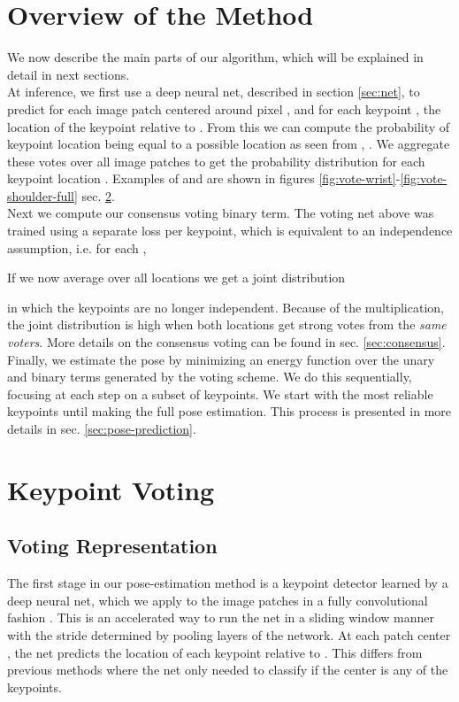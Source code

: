\documentclass{article}
\begin{document}
\section{Overview of the Method}
We now describe the main parts of our algorithm, which will be explained in detail in next sections.\\

At inference, we first use a deep neural net, described in section \ref{sec:net}, to predict for each image patch  centered around pixel , and for each keypoint , the location of the keypoint relative to . From this we can compute the probability of keypoint location   being equal to a possible location  as seen from , . We aggregate these votes over all image patches to get the probability distribution for each keypoint location .  Examples of  and  are shown in figures \ref{fig:vote-wrist}-\ref{fig:vote-shoulder-full} sec. \ref{sec:voting}.\\

Next we compute our consensus voting binary term. The voting net above was trained using a separate loss  per keypoint, which is equivalent to an independence assumption, i.e. for each ,


If we now average over all locations  we get a joint distribution 

in which the keypoints are no longer independent. Because of the multiplication, the joint distribution is high when both locations get strong votes from the \emph{same voters}. More details on the consensus voting can be found in sec. \ref{sec:consensus}.\\

Finally, we estimate the pose by minimizing an energy function over the unary and binary terms generated by the voting scheme. We do this sequentially, focusing at each step on a subset of keypoints. We start with the most reliable keypoints until making the full pose estimation. This process is presented in more details in sec. \ref{sec:pose-prediction}.   



\section{Keypoint Voting}\label{sec:voting}
\subsection{Voting Representation}

The first stage in our pose-estimation method is a keypoint detector learned by a deep neural net, which we apply to the image patches in a fully convolutional fashion \cite{Long15}. This is an accelerated way to run the net in a sliding window manner with the stride determined by pooling layers of the network. At each patch center , the net predicts the location of each keypoint  relative to . This differs from previous methods \cite{Tompson14,Tompson15} where the net only needed to classify if the center  is any of the  keypoints.\\
\end{document}
